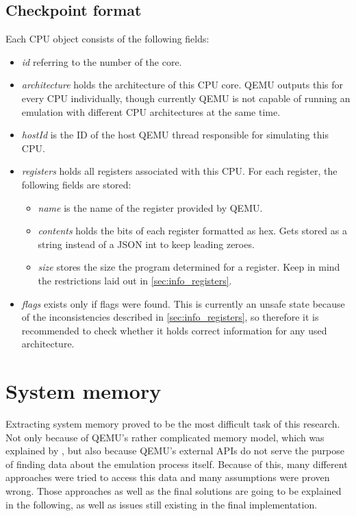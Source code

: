 \subsection{Checkpoint format}
Each CPU object consists of the following fields:
\begin{itemize}
    \item \emph{id} referring to the number of the core.
    \item \emph{architecture} holds the architecture of this CPU core.
    QEMU outputs this for every CPU individually,
    though currently QEMU is not capable of running an emulation with different CPU architectures at the same time.
    \item \emph{hostId} is the ID of the host QEMU thread responsible for simulating this CPU.
    \item \emph{registers} holds all registers associated with this CPU.
    For each register, the following fields are stored:
    \begin{itemize}
        \item \emph{name} is the name of the register provided by QEMU.
        \item \emph{contents} holds the bits of each register formatted as hex.
        Gets stored as a string instead of a JSON int to keep leading zeroes.
        \item \emph{size} stores the size the program determined for a register.
        Keep in mind the restrictions laid out in \autoref{sec:info_registers}.
    \end{itemize}
    \item \emph{flags} exists only if flags were found.
    This is currently an unsafe state because of the inconsistencies described in \autoref{sec:info_registers},
    so therefore it is recommended to check whether it holds correct information for any used architecture.
\end{itemize}

\section{System memory}\label{sec:memory_extraction}
Extracting system memory proved to be the most difficult task of this research.
Not only because of QEMU's rather complicated memory model,
which was explained by \cite{kitcheckpoints},
but also because QEMU's external APIs do not serve the purpose of finding data about the emulation process itself.
Because of this, many different approaches were tried to access this data
and many assumptions were proven wrong.
Those approaches as well as the final solutions are going to be explained in the following,
as well as issues still existing in the final implementation.

